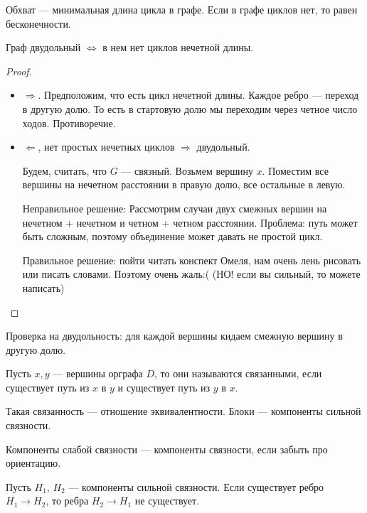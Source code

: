 \begin{definition}
    Обхват --- минимальная длина цикла в графе. Если в графе циклов нет, то равен бесконечности.
\end{definition}
\begin{definition}
    Граф двудольный $\iff$ в нем нет циклов нечетной длины.
\end{definition}
\begin{proof}
    \slashn
    \begin{itemize}
        \item $\Rightarrow$. Предположим, что есть цикл нечетной длины. Каждое ребро --- переход в другую долю. То есть в стартовую долю мы переходим через четное число ходов. Противоречие.
        \item $\Leftarrow$, нет простых нечетных циклов  $\Rightarrow$ двудольный.

            Будем, считать, что $G$ --- связный. Возьмем вершину  $x$. Поместим все вершины на нечетном расстоянии в правую долю, все остальные в левую. 

            Неправильное решение: Рассмотрим случаи двух смежных вершин на нечетном + нечетном и четном + четном расстоянии. Проблема: путь может быть сложным, поэтому объединение может давать не простой цикл. 

            Правильное решение: пойти читать конспект Омеля, нам очень лень рисовать или писать словами. Поэтому очень жаль:( (НО! если вы сильный, то можете написать)
    \end{itemize}
\end{proof}
\slashn
Проверка на двудольность: для каждой вершины кидаем смежную вершину в другую долю.
\begin{definition}
    Пусть $x, y$ --- вершины орграфа  $D$, то они называются связанными, если существует путь из  $x$ в  $y$ и существует путь из  $y$ в  $x$.
\end{definition}
\begin{remark}
    Такая связанность --- отношение эквивалентности. 
    Блоки --- компоненты сильной связности.
\end{remark}
\begin{definition}
    Компоненты слабой связности --- компоненты связности, если забыть про ориентацию.
\end{definition}
\begin{lemma}
    Пусть $H_1$,  $H_2$ --- компоненты сильной связности. Если существует ребро  $H_1 \to H_2$, то ребра $H_2 \to H_1$ не существует.
\end{lemma}
